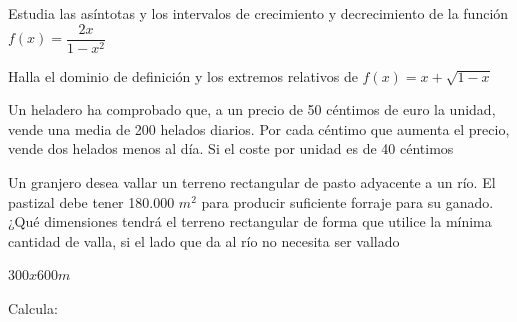 \documentclass[addpoints,spanish, 12pt,a4paper]{exam}
\begin{document}
\begin{questions}
\question[4] Estudia las asíntotas y los intervalos de crecimiento y decrecimiento de la función $f(x)=\dfrac{2x}{1-x^2}$

\question[3] Halla el dominio de definición y los extremos relativos de $f(x)=x+\sqrt{1-x}$

\question[1] Un heladero ha comprobado que, a un precio de 50 céntimos de euro la unidad, vende una media de 200
helados diarios. Por cada céntimo que aumenta el precio, vende dos helados menos al día. Si el coste por
unidad es de 40 céntimos

\question Un granjero desea vallar un terreno rectangular de pasto adyacente a un río. El pastizal debe tener 180.000
$m^2$
para producir suficiente forraje para su ganado. ¿Qué dimensiones tendrá el terreno rectangular de
forma que utilice la mínima cantidad de valla, si el lado que da al río no necesita ser vallado
\begin{solution}
    $300 x 600 m$
\end{solution}




\question Calcula:



\end{questions}
\end{document}

